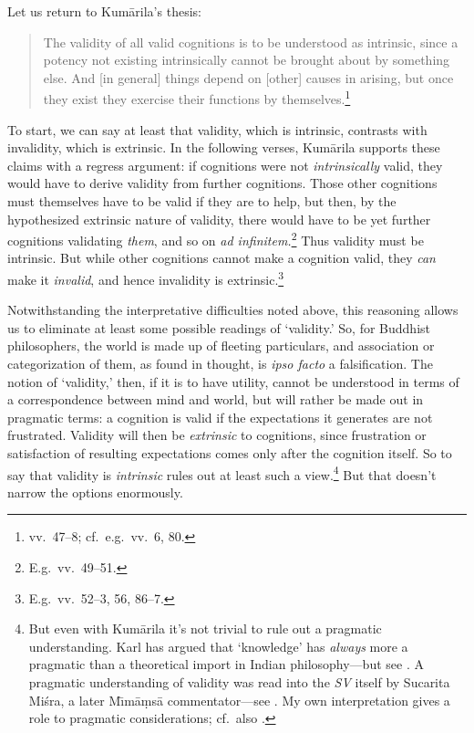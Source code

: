 ﻿\documentclass[11pt]{amsart}
\begin{document}
Let us return to Kum\=arila's thesis:\small \begin{quote}The validity of all valid cognitions is to be understood as intrinsic, since a potency not existing intrinsically cannot be brought about by something else. And [in general] things depend on [other] causes in arising, but once they exist they exercise their functions by themselves.\footnote{vv.~47--8; cf.~e.g.~vv.~6, 80.}\end{quote} \normalsize To start, we can say at least that validity, which is intrinsic, contrasts with invalidity, which is extrinsic. In the following verses, Kum\=arila supports these claims with a regress argument: if cognitions were not \emph{intrinsically} valid, they would have to derive validity from further cognitions. Those other cognitions must themselves have to be valid if they are to help, but then, by the hypothesized extrinsic nature of validity, there would have to be yet further cognitions validating \emph{them}, and so on \emph{ad infinitem.}\footnote{E.g.~vv.~49--51.} Thus validity must be intrinsic. But while other cognitions cannot make a cognition valid, they \emph{can} make it \emph{invalid}, and hence invalidity is extrinsic.\footnote{E.g.~vv.~52--3, 56, 86--7.}

Notwithstanding the interpretative difficulties noted above, this reasoning allows us to eliminate at least some possible readings of `validity.' So, for Buddhist philosophers, the world is made up of fleeting particulars, and association or categorization of them, as found in thought, is \emph{ipso facto} a falsification. The notion of `validity,' then, if it is to have utility, cannot be understood in terms of a correspondence between mind and world, but will rather be made out in pragmatic terms: a cognition is valid if the expectations it generates are not frustrated. Validity will then be \emph{extrinsic} to cognitions, since frustration or satisfaction of resulting expectations comes only after the cognition itself. So to say that validity is \emph{intrinsic} rules out at least such a view.\footnote{But even with Kum\=arila it's not trivial to rule out a pragmatic understanding. Karl \citet{potter1984die, potter1992presuppositions} has argued that `knowledge' has \emph{always} more a pragmatic than a theoretical import in Indian philosophy---but see \citet{mohanty1984pramanya}. A pragmatic understanding of validity was read into the \emph{SV} itself by Sucarita Mi\'sra, a later M\={\i}m\=a\d ms\=a commentator---see \citet[p.~52--53]{chatterjea2003svatah}. My own interpretation gives a role to pragmatic considerations; cf.~also \citet[pp.~XX]{bhatt1962epistemology}.} But that doesn't narrow the options enormously.
\end{document}
